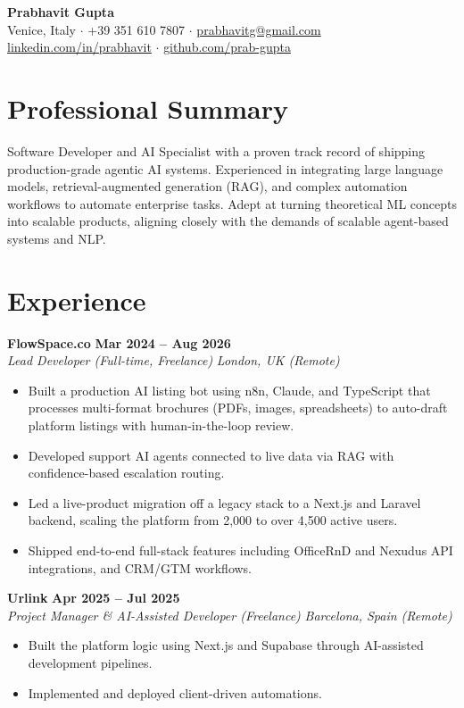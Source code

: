 \documentclass[11pt,a4paper]{article}
\begin{document}
\pagestyle{empty}

\begin{center}
    {\Huge \textbf{Prabhavit Gupta}} \\ \vspace{4pt}
    Venice, Italy $\cdot$ +39 351 610 7807 $\cdot$ \href{mailto:prabhavitg@gmail.com}{prabhavitg@gmail.com} \\
    \href{https://www.linkedin.com/in/prabhavit/}{linkedin.com/in/prabhavit} $\cdot$ \href{https://github.com/prab-gupta}{github.com/prab-gupta}
\end{center}

\section{Professional Summary}
Software Developer and AI Specialist with a proven track record of shipping production-grade agentic AI systems. Experienced in integrating large language models, retrieval-augmented generation (RAG), and complex automation workflows to automate enterprise tasks. Adept at turning theoretical ML concepts into scalable products, aligning closely with the demands of scalable agent-based systems and NLP.

\section{Experience}
\noindent \textbf{FlowSpace.co} \hfill \textbf{Mar 2024 -- Aug 2026} \\
\textit{Lead Developer (Full-time, Freelance)} \hfill \textit{London, UK (Remote)}
\begin{itemize}[leftmargin=*,itemsep=2pt]
    \item Built a production AI listing bot using n8n, Claude, and TypeScript that processes multi-format brochures (PDFs, images, spreadsheets) to auto-draft platform listings with human-in-the-loop review.
    \item Developed support AI agents connected to live data via RAG with confidence-based escalation routing.
    \item Led a live-product migration off a legacy stack to a Next.js and Laravel backend, scaling the platform from 2,000 to over 4,500 active users.
    \item Shipped end-to-end full-stack features including OfficeRnD and Nexudus API integrations, and CRM/GTM workflows.
\end{itemize}

\noindent \textbf{Urlink} \hfill \textbf{Apr 2025 -- Jul 2025} \\
\textit{Project Manager \& AI-Assisted Developer (Freelance)} \hfill \textit{Barcelona, Spain (Remote)}
\begin{itemize}[leftmargin=*,itemsep=2pt]
    \item Built the platform logic using Next.js and Supabase through AI-assisted development pipelines.
    \item Implemented and deployed client-driven automations.
\end{itemize}
\end{document}
